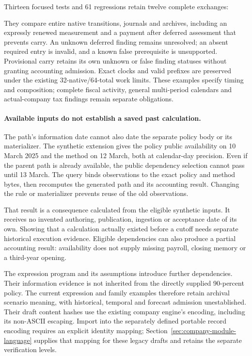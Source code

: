 Thirteen focused tests and 61 regressions retain twelve complete exchanges:
\begin{flushleft}\small
{}
\end{flushleft}
They compare entire native transitions, journals and archives, including an expressly renewed
measurement and a payment after deferred assessment that prevents carry.
An unknown deferred finding remains unresolved; an absent required entry is
invalid, and a known false prerequisite is unsupported. Provisional carry
retains its own unknown or false finding statuses without granting accounting
admission. Exact clocks and valid prefixes are preserved under the existing
32-native/64-total work limits. These examples specify timing and composition;
complete fiscal activity, general multi-period calendars and actual-company
tax findings remain separate obligations.


\paragraph{Available inputs do not establish a saved past calculation.}
The path's information date cannot also date the separate policy body or its
materializer. The synthetic extension gives the policy public availability on
10 March 2025 and the method on 12 March, both at calendar-day precision.
Even if the parent path is already available, the public dependency selection
cannot pass until 13 March. The query binds observations to the exact policy
and method bytes, then recomputes the generated path and its accounting result.
Changing the rule or materializer prevents reuse of the old observations.

That result is a consequence calculated from the eligible synthetic inputs.
It receives no invented authoring, publication, ingestion or acceptance date
of its own. Showing that a calculation actually existed before a cutoff needs
separate historical execution evidence. Eligible dependencies can also produce
a partial accounting result: availability does not supply missing payroll,
closing memory or a third-year opening.

The expression program and its assumptions introduce further dependencies.
Their information evidence is not inherited from the directly supplied
90-percent policy. The current expression and family examples therefore retain
archival scenario meaning, with historical, temporal and forecast admission
unestablished. Their draft content hashes use the existing company engine's
encoding, including its non-ASCII escaping. Import into the separately defined
portable record encoding requires an explicit identity mapping;
Section~\ref{sec:company-module-language} supplies that mapping for these
legacy drafts and retains the separate verification levels.

